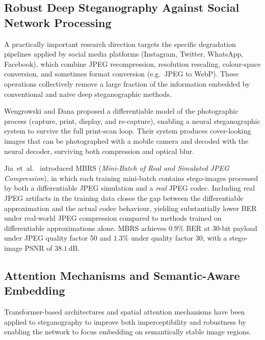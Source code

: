 \documentclass[12pt,a4paper,oneside]{report}
\begin{document}
	
	\subsection{Robust Deep Steganography Against Social Network Processing}
	\label{subsec:social_network}
	
	A practically important research direction targets the specific degradation pipelines applied by
	social media platforms (Instagram, Twitter, WhatsApp, Facebook), which combine JPEG recompression,
	resolution rescaling, colour-space conversion, and sometimes format conversion (e.g.\ JPEG to
	WebP). These operations collectively remove a large fraction of the information embedded by
	conventional and naive deep steganographic methods.
	
	Wengrowski and Dana \cite{wengrowski2019light} proposed a differentiable model of the photographic
	process (capture, print, display, and re-capture), enabling a neural steganographic system to
	survive the full print-scan loop. Their system produces cover-looking images that can be
	photographed with a mobile camera and decoded with the neural decoder, surviving both compression
	and optical blur.
	
	Jia~et~al.\ \cite{jia2021mbrs} introduced MBRS (\textit{Mini-Batch of Real and Simulated JPEG
		Compression}), in which each training mini-batch contains stego-images processed by both a
	differentiable JPEG simulation and a \emph{real} JPEG codec. Including real JPEG artifacts in the
	training data closes the gap between the differentiable approximation and the actual codec behaviour,
	yielding substantially lower BER under real-world JPEG compression compared to methods trained on
	differentiable approximations alone. MBRS achieves $0.9\%$ BER at $30$-bit payload under JPEG
	quality factor 50 and $1.3\%$ under quality factor 30, with a stego-image PSNR of $38.1$\,dB.
	
	\subsection{Attention Mechanisms and Semantic-Aware Embedding}
	\label{subsec:attention}
	
	Transformer-based architectures and spatial attention mechanisms have been applied to
	steganography to improve both imperceptibility and robustness by enabling the network to
	focus embedding on semantically stable image regions.
	
\end{document}
